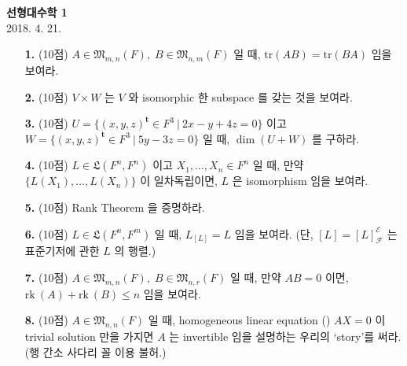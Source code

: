 \documentclass[12pt]{report}
\newcommand*{\trans}{^{\mathrm{\mathbf{t}}}}%
\newcommand*{\tr}{\mathrm{tr}}%
\newcommand*{\matrixM}{\mathfrak{M}}%
\newcommand*{\rk}{\mathrm{rk}\:}%
\begin{document}
\begin{center}
\textbf{선형대수학 1}\\
2018. 4. 21.
\end{center}

\begin{itemize}
\item[\textbf{1.}] (10점) $A\in \matrixM_{m, n}(F), \; B \in \matrixM_{n, m}(F)$ 일 때, $\tr(AB) = \tr(BA)$ 임을 보여라.   
\\  
\item[\textbf{2.}] (10점) $V\times W$ 는 $V$ 와 isomorphic 한 subspace 를 갖는 것을 보여라.
\\
\item[\textbf{3.}] (10점) $U=\{(x, y, z)\trans \in F^3 \:|\: 2x-y+4z=0\}$ 이고 $W = \{(x, y, z)\trans \in F^3 \:|\: 5y-3z=0\}$ 일 때, $\dim(U+W)$ 를 구하라.
\\
\item[\textbf{4.}] (10점) $L\in\mathfrak{L}(F^n, F^n)$ 이고 $X_1, \dots, X_n\in F^n$ 일 때, 만약 $\{L(X_1), \dots, L(X_n)\}$ 이 일차독립이면, $L$ 은 isomorphism 임을 보여라.
\\
\item[\textbf{5.}] (10점) Rank Theorem 을 증명하라.
\\
\item[\textbf{6.}] (10점) $L \in \mathfrak{L}(F^n, F^m)$ 일 때, $L_{\left[L\right]} = L$ 임을 보여라. (단, $\left[L\right] = \left[L\right]_{\mathcal{F}}^{\mathcal{E}}$ 는 표준기저에 관한 $L$ 의 행렬.)
\\
\item[\textbf{7.}] (10점) $A\in \matrixM_{m, n}(F),\; B \in \matrixM_{n, r}(F)$ 일 때, 만약 $AB=0$ 이면, $\rk(A) + \rk(B) \leq n$ 임을 보여라.
\\
\item[\textbf{8.}] (10점) $A \in \matrixM_{n, n}(F)$ 일 때, homogeneous linear equation (\textasteriskcentered) $AX=0$ 이 trivial solution 만을 가지면 $A$ 는 invertible 임을 설명하는 우리의 `story'를 써라. (행 간소 사다리 꼴 이용 불허.)

\end{itemize}
\end{document}
